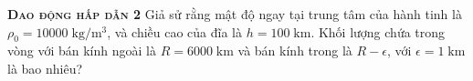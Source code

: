 \begin{problem}
\textbf{\textsc{Dao động hấp dẫn 2}} Giả sử rằng mật độ ngay tại trung tâm của hành tinh là \(\rho_0=10000 \; \mathrm{kg/m^3}\), và chiều cao của đĩa là $h = 100 \; \mathrm{km}$. Khối lượng chứa trong vòng với bán kính ngoài là \(R = 6000 \; \mathrm{km}\) và bán kính trong là \(R - \epsilon\), với $\epsilon=1 \; \mathrm{km}$ là bao nhiêu?
    
\end{problem}
